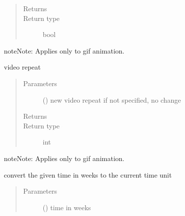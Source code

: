 \documentclass[letterpaper,10pt,english]{sphinxmanual}
\begin{document}
\begin{fulllineitems}
\begin{fulllineitems}
\begin{quote}
\begin{description}
\item[{Returns}] \leavevmode
{}

\item[{Return type}] \leavevmode
bool

\end{description}\end{quote}

\begin{sphinxadmonition}{note}{Note:}
Applies only to gif animation.
\end{sphinxadmonition}

\end{fulllineitems}


\begin{fulllineitems}
\label{\detokenize{Reference:salabim.Environment.video_repeat}}
video repeat
\begin{quote}\begin{description}
\item[{Parameters}] \leavevmode
{} () \textendash{} new video repeat 
if not specified, no change

\item[{Returns}] \leavevmode
{}

\item[{Return type}] \leavevmode
int

\end{description}\end{quote}

\begin{sphinxadmonition}{note}{Note:}
Applies only to gif animation.
\end{sphinxadmonition}

\end{fulllineitems}


\begin{fulllineitems}
\label{\detokenize{Reference:salabim.Environment.weeks}}
convert the given time in weeks to the current time unit
\begin{quote}\begin{description}
\item[{Parameters}] \leavevmode
{} () \textendash{} time in weeks


\end{description}
\end{quote}
\end{fulllineitems}
\end{fulllineitems}
\end{document}

